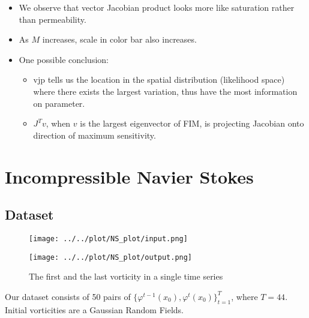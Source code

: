\documentclass[
]{article}
\providecommand{\tightlist}{%
  \setlength{\itemsep}{0pt}\setlength{\parskip}{0pt}}\usepackage{longtable,booktabs,array}
\begin{document}
\begin{itemize}
\tightlist
\item
  We observe that vector Jacobian product looks more like saturation
  rather than permeability.
\item
  As \(M\) increases, scale in color bar also increases.
\item
  One possible conclusion:

  \begin{itemize}
  \tightlist
  \item
    vjp tells us the location in the spatial distribution (likelihood
    space) where there exists the largest variation, thus have the most
    information on parameter.
  \item
    \(J^Tv\), when \(v\) is the largest eigenvector of FIM, is
    projecting Jacobian onto direction of maximum sensitivity.
  \end{itemize}
\end{itemize}

\section{Incompressible Navier
Stokes}\label{incompressible-navier-stokes}

\subsection{Dataset}\label{dataset-1}

\begin{figure}

\begin{minipage}{0.50\linewidth}

\texttt{[image: ../../plot/NS\_plot/input.png]}

\end{minipage}%
%
\begin{minipage}{0.50\linewidth}

\texttt{[image: ../../plot/NS\_plot/output.png]}

\end{minipage}%

\caption{\label{fig-vort}The first and the last vorticity in a single
time series}

\end{figure}%

Our dataset consists of 50 pairs of
\(\{\varphi^{t-1}(x_0), \varphi^t(x_0)\}^T_{t=1}\), where \(T=44\).
Initial vorticities are a Gaussian Random Fields.
\end{document}
